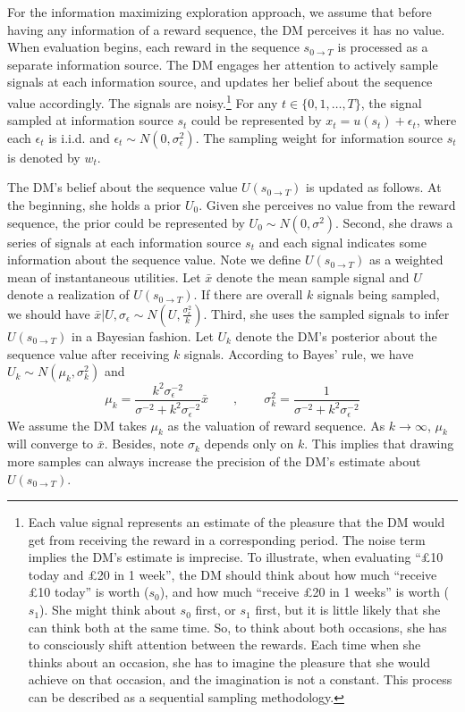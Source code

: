\documentclass[
  12pt,
]{article}
\begin{document}
For the information maximizing exploration approach, we assume that
before having any information of a reward sequence, the DM perceives it
has no value. When evaluation begins, each reward in the sequence
\(s_{0\rightarrow T}\) is processed as a separate information source.
The DM engages her attention to actively sample signals at each
information source, and updates her belief about the sequence value
accordingly. The signals are noisy.\footnote{Each value signal
  represents an estimate of the pleasure that the DM would get from
  receiving the reward in a corresponding period. The noise term implies
  the DM's estimate is imprecise. To illustrate, when evaluating ``£10
  today and £20 in 1 week'', the DM should think about how much
  ``receive £10 today'' is worth (\(s_0\)), and how much ``receive £20
  in 1 weeks'' is worth (\(s_1\)). She might think about \(s_0\) first,
  or \(s_1\) first, but it is little likely that she can think both at
  the same time. So, to think about both occasions, she has to
  consciously shift attention between the rewards. Each time when she
  thinks about an occasion, she has to imagine the pleasure that she
  would achieve on that occasion, and the imagination is not a constant.
  This process can be described as a sequential sampling methodology.}
For any \(t\in\{0,1,…,T\}\), the signal sampled at information source
\(s_t\) could be represented by \(x_t =u(s_t)+\epsilon_t\), where each
\(\epsilon_t\) is i.i.d. and \(\epsilon_t \sim N(0,\sigma_\epsilon^2)\).
The sampling weight for information source \(s_t\) is denoted by
\(w_t\).

The DM's belief about the sequence value \(U(s_{0\rightarrow T})\) is
updated as follows. At the beginning, she holds a prior \(U_0\). Given
she perceives no value from the reward sequence, the prior could be
represented by \(U_0 \sim N(0, \sigma^2)\). Second, she draws a series
of signals at each information source \(s_t\) and each signal indicates
some information about the sequence value. Note we define
\(U(s_{0\rightarrow T})\) as a weighted mean of instantaneous utilities.
Let \(\bar{x}\) denote the mean sample signal and \(U\) denote a
realization of \(U(s_{0\rightarrow T})\). If there are overall \(k\)
signals being sampled, we should have
\(\bar{x} | U, \sigma_\epsilon\sim N(U,\frac{\sigma_{\epsilon}^2}{k})\).
Third, she uses the sampled signals to infer \(U(s_{0\rightarrow T})\)
in a Bayesian fashion. Let \(U_k\) denote the DM's posterior about the
sequence value after receiving \(k\) signals. According to Bayes' rule,
we have \(U_k\sim N(\mu_k,\sigma_k^2)\) and\[
\mu_k = \frac{k^2\sigma_\epsilon^{-2}}{\sigma^{-2}+k^2\sigma_\epsilon^{-2}}\bar{x}\qquad,\qquad 
\sigma_k^2 =  \frac{1}{\sigma^{-2}+k^2\sigma_\epsilon^{-2}}
\]We assume the DM takes \(\mu_k\) as the valuation of reward sequence.
As \(k\rightarrow \infty\), \(\mu_k\) will converge to \(\bar{x}\).
Besides, note \(\sigma_k\) depends only on \(k\). This implies that
drawing more samples can always increase the precision of the DM's
estimate about \(U(s_{0\rightarrow T})\).
\end{document}
